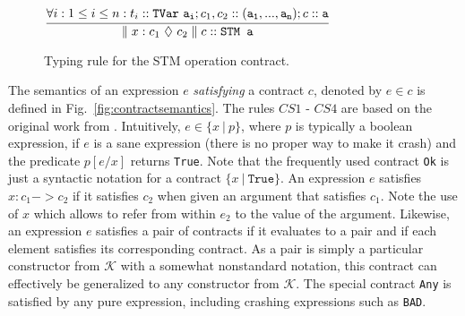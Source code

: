 \documentclass[submission,copyright,creativecommons]{eptcs}
\begin{document}
\begin{figure}[htb]
  \centering
  $\cfrac{\forall i : 1 \leq i \leq n : t_i :: \mathtt{TVar \ a_i} ; c_1,c_2 :: (\mathtt{a_1},...,\mathtt{a_n}) ; c::\mathtt{a}}{\parallel x : c_1 \ \lozenge \ c_2 \parallel c :: \texttt{STM a}}$
  \caption{Typing rule for the STM operation contract.}
  \label{fig:typing}
\end{figure}




The semantics of an expression $e$ \emph{satisfying} a contract $c$, denoted by $e \in c$ is defined in Fig.~\ref{fig:contractsemantics}. The rules $CS1$ - $CS4$ are based on the original work from \cite{static-contract-checking}. 
Intuitively, $e \in \{ x \ | \ p \}$, where $p$ is typically a boolean expression, if $e$ is a sane expression (there is no proper way to make it crash) and the predicate $p[e/x]$ returns \texttt{True}. 
Note that the frequently used contract \texttt{Ok} is just a syntactic notation for a contract $\{ x \ | \ \mathtt{True} \}$.
An expression $e$ satisfies $x : c_1 -> c_2$ if it satisfies $c_2$ when given an argument that satisfies $c_1$. Note the use of $x$ which allows to refer from within $e_2$ to the value of the argument.
Likewise, an expression $e$ satisfies a pair of contracts if it evaluates to a pair and if each element satisfies its corresponding contract. As a pair is simply a particular constructor from $\mathcal{K}$ with a somewhat nonstandard notation, this contract can effectively be generalized to any constructor from $\mathcal{K}$. 
The special contract \texttt{Any} is satisfied by any pure expression, including crashing expressions such as \texttt{BAD}. 
\end{document}

